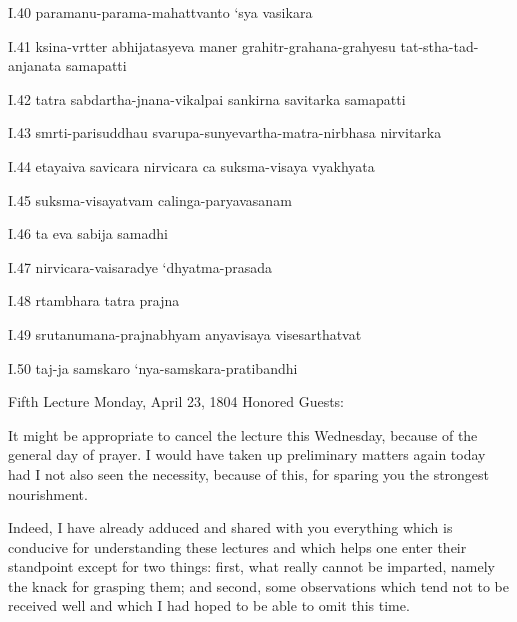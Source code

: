  
I.40
paramanu-parama-mahattvanto ‘sya vasikara

I.41
ksina-vrtter abhijatasyeva maner grahitr-grahana-grahyesu
tat-stha-tad-anjanata samapatti

I.42
tatra sabdartha-jnana-vikalpai sankirna savitarka samapatti

I.43
smrti-parisuddhau svarupa-sunyevartha-matra-nirbhasa nirvitarka

I.44
etayaiva savicara nirvicara ca suksma-visaya vyakhyata

I.45
suksma-visayatvam calinga-paryavasanam

I.46
ta eva sabija samadhi

I.47
nirvicara-vaisaradye ‘dhyatma-prasada

I.48
rtambhara tatra prajna

I.49
srutanumana-prajnabhyam anyavisaya visesarthatvat

I.50
taj-ja samskaro ‘nya-samskara-pratibandhi

Fifth Lecture
Monday, April 23, 1804
Honored Guests:

It might be appropriate to cancel the lecture this Wednesday,
because of the general day of prayer.
I would have taken up preliminary matters again today
had I not also seen the necessity, because of this,
for sparing you the strongest nourishment.

Indeed, I have already adduced and shared with you
everything which is conducive for understanding these lectures
and which helps one enter their standpoint except for two things:
first, what really cannot be imparted,
namely the knack for grasping them;
and second, some observations which tend
not to be received well and which
I had hoped to be able to omit this time.

